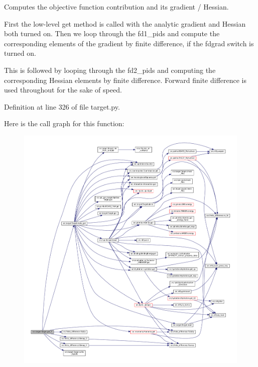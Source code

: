 Computes the objective function contribution and its gradient / Hessian. 

First the low-\/level \textquotesingle{}get\textquotesingle{} method is called with the analytic gradient and Hessian both turned on. Then we loop through the fd1\+\_\+pids and compute the corresponding elements of the gradient by finite difference, if the \textquotesingle{}fdgrad\textquotesingle{} switch is turned on.

This is followed by looping through the fd2\+\_\+pids and computing the corresponding Hessian elements by finite difference. Forward finite difference is used throughout for the sake of speed. 

Definition at line 326 of file target.\+py.

Here is the call graph for this function\+:
\nopagebreak
\begin{figure}[H]
\begin{center}
\leavevmode
\includegraphics[width=350pt]{classsrc_1_1target_1_1Target_adae73b394ec5a1c22fe57d90265de537_cgraph}
\end{center}
\end{figure}
\mbox{\label{classsrc_1_1target_1_1Target_acd106ed266687c08937944d4c0d17d87}} 
